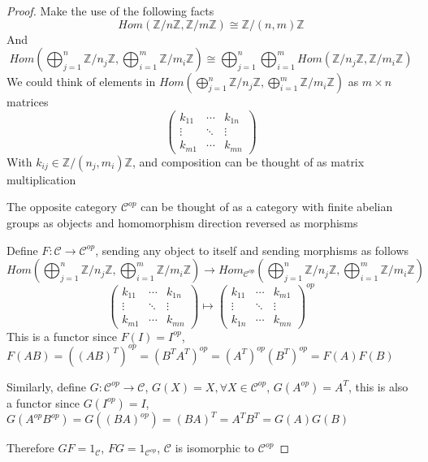 \documentclass{article}
\theoremstyle{definition}
\theoremstyle{remark}
\theoremstyle{definition}
\begin{document}
\begin{proof}
Make the use of the following facts
\[Hom(\mathbb Z/n\mathbb Z,\mathbb Z/m\mathbb Z)\cong \mathbb Z/(n,m)\mathbb Z\]
And
\[\displaystyle Hom\left(\bigoplus_{j=1}^n\mathbb Z/n_j\mathbb Z,\bigoplus_{i=1}^m\mathbb Z/m_i\mathbb Z\right)\cong\bigoplus_{j=1}^n\bigoplus_{i=1}^m Hom\left(\mathbb Z/n_j\mathbb Z,\mathbb Z/m_i\mathbb Z\right)\]
We could think of elements in $\displaystyle Hom\left(\bigoplus_{j=1}^n\mathbb Z/n_j\mathbb Z,\bigoplus_{i=1}^m\mathbb Z/m_i\mathbb Z\right)$ as $m\times n$ matrices
\[
\begin{pmatrix}
k_{11} &\cdots & k_{1n} \\
\vdots &\ddots & \vdots \\
k_{m1} &\cdots & k_{mn}
\end{pmatrix}
\]
With $k_{ij}\in\mathbb Z/(n_j,m_i)\mathbb Z$, and composition can be thought of as matrix multiplication \par
The opposite category $\mathcal C^{op}$ can be thought of as a category with finite abelian groups as objects and homomorphism direction reversed as morphisms \par
Define $F:\mathcal C\to\mathcal C^{op}$, sending any object to itself and sending morphisms as follows
\[Hom\left(\bigoplus_{j=1}^n\mathbb Z/n_j\mathbb Z,\bigoplus_{i=1}^m\mathbb Z/m_i\mathbb Z\right)\to Hom_{\mathcal C^{op}}\left(\bigoplus_{j=1}^n\mathbb Z/n_j\mathbb Z,\bigoplus_{i=1}^m\mathbb Z/m_i\mathbb Z\right)\]
\[
\begin{pmatrix}
k_{11} &\cdots & k_{1n} \\
\vdots &\ddots & \vdots \\
k_{m1} &\cdots & k_{mn}
\end{pmatrix}
\mapsto
\begin{pmatrix}
k_{11} &\cdots & k_{m1} \\
\vdots &\ddots & \vdots \\
k_{1n} &\cdots & k_{mn}
\end{pmatrix}^{op}
\]
This is a functor since $F(I)=I^{op}$, $F(AB)=\left((AB)^T\right)^{op}=\left(B^TA^T\right)^{op}=\left(A^T\right)^{op}\left(B^T\right)^{op}=F(A)F(B)$ \par
Similarly, define $G:\mathcal C^{op}\to\mathcal C$, $G(X)=X,\forall X\in \mathcal C^{op}$, $G(A^{op})=A^T$, this is also a functor since $G(I^{op})=I$, $G(A^{op}B^{op})=G\left((BA)^{op}\right)=(BA)^T=A^TB^T=G(A)G(B)$ \par
Therefore $GF=1_{\mathcal C}$, $FG=1_{\mathcal C^{op}}$, $\mathcal C$ is isomorphic to $\mathcal C^{op}$ \par

\end{proof}
\end{document}
